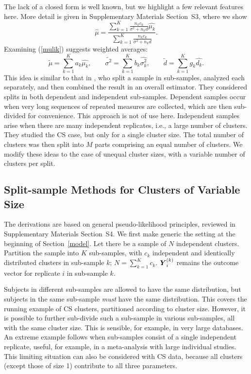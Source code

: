 \documentclass[11pt,a5paper,twoside]{book}
\newcommand{\BY}{\mbox{\boldmath $Y$}}
\begin{document}
The lack of a closed form is well known, but we highlight a few relevant features here. More detail is given in Supplementary Materials Section~S3,
where we show
\begin{equation}
\widehat{\mu}
=
\frac
{
\sum_{k=1}^K\frac{n_k c_k}{\sigma^2+n_k d} \widehat{\mu_k}
}
{
\sum_{k=1}^K\frac{n_k c_k}{\sigma^2+n_k d}
}.
\label{mulik}
\end{equation}
Examining (\ref{mulik}) suggests weighted averages:
\begin{equation}
\label{weightavermu}
\widetilde{\mu}=\sum_{k=1}^Ka_k\widehat{\mu_k},\qquad
\widetilde{\sigma^2}=\sum_{k=1}^Kb_k\widehat{\sigma^2_k},\qquad
\widetilde{d}=\sum_{k=1}^Kg_k\widehat{d_k}.
\end{equation}
This idea is  similar to that in \cite{Iddi2011}, who split a sample in sub-samples, analyzed each  separately, and then combined the result in an overall estimator. They considered splits in both dependent and independent sub-samples. Dependent samples occur when very long sequences of repeated measures are collected, which are then sub-divided for convenience. This approach is not of use here. Independent samples arise when there are many independent replicates, i.e., a large number of clusters. They studied the CS case, but only for a single cluster size. The total number of clusters was then split into $M$ parts comprising an equal number of clusters. We modify these ideas to the case of unequal cluster sizes, with a variable number of clusters per split.

\subsection{Split-sample Methods for Clusters of Variable Size}
\label{CSsplitsample}

The derivations are based on general pseudo-likelihood principles, reviewed in Supplementary Materials Section~S4.
We first make generic the setting at the beginning of Section~\ref{model}. 
Let there be a sample of $N$ independent clusters. Partition the 
sample into $K$ sub-samples, with $c_k$ independent and identically 
distributed clusters in sub-sample $k$; $N=\sum_{k=1}^Kc_k$. 
$\BY_i^{(k)}$ remains the outcome vector for replicate $i$ in 
sub-sample $k$.

Subjects in different sub-samples are allowed to have 
the same distribution, but subjects in the same sub-sample 
{\em must\/} have the same distribution. This covers the running 
example of CS clusters, partitioned according to cluster size. 
However, it is possible to further sub-divide such a sub-sample 
in various sub-samples, all with the same cluster size. This is 
sensible, for example, in very large databases. An extreme example 
follows when sub-samples consist of a single independent replicate, useful, for example, in a meta-analysis with large individual 
studies. This limiting situation can also be considered with CS data, 
because all clusters (except those of size 1) contribute to all three 
parameters.
\end{document}
